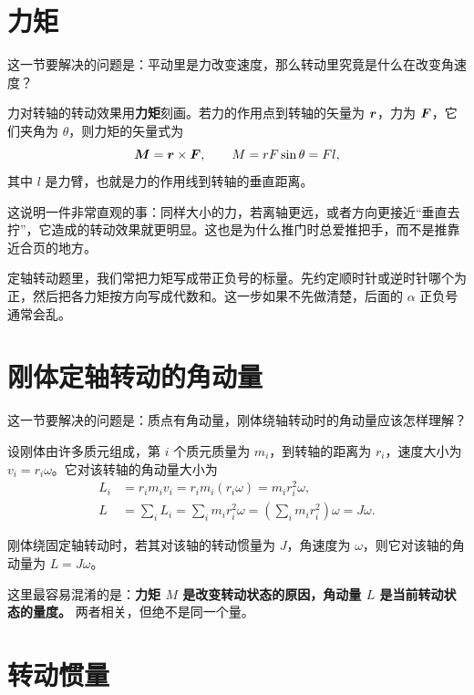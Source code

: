 \documentclass[lang=cn,11pt]{elegantbook}
\begin{document}
\section{力矩}

这一节要解决的问题是：平动里是力改变速度，那么转动里究竟是什么在改变角速度？

力对转轴的转动效果用\textbf{力矩}刻画。若力的作用点到转轴的矢量为 \(\vb*{r}\)，力为 \(\vb*{F}\)，它们夹角为 \(\theta\)，则力矩的矢量式为
\[
\vb*{M}=\vb*{r}\times \vb*{F},\qquad
M=rF\sin\theta=Fl,
\]
其中 \(l\) 是力臂，也就是力的作用线到转轴的垂直距离。

这说明一件非常直观的事：同样大小的力，若离轴更远，或者方向更接近“垂直去拧”，它造成的转动效果就更明显。这也是为什么推门时总爱推把手，而不是推靠近合页的地方。

\begin{note}
定轴转动题里，我们常把力矩写成带正负号的标量。先约定顺时针或逆时针哪个为正，然后把各力矩按方向写成代数和。这一步如果不先做清楚，后面的 \(\alpha\) 正负号通常会乱。
\end{note}

\section{刚体定轴转动的角动量}

这一节要解决的问题是：质点有角动量，刚体绕轴转动时的角动量应该怎样理解？

设刚体由许多质元组成，第 \(i\) 个质元质量为 \(m_i\)，到转轴的距离为 \(r_i\)，速度大小为 \(v_i=r_i\omega\)。它对该转轴的角动量大小为
\[
\begin{aligned}
L_i&=r_i m_i v_i=r_i m_i(r_i\omega)=m_i r_i^2\omega,\\
L&=\sum_i L_i=\sum_i m_i r_i^2\omega
=\left(\sum_i m_i r_i^2\right)\omega=J\omega.
\end{aligned}
\]

\begin{definition}[刚体定轴转动的角动量]
刚体绕固定轴转动时，若其对该轴的转动惯量为 \(J\)，角速度为 \(\omega\)，则它对该轴的角动量为 \(L=J\omega\)。
\end{definition}

\begin{note}
这里最容易混淆的是：\textbf{力矩 \(M\) 是改变转动状态的原因，角动量 \(L\) 是当前转动状态的量度。} 两者相关，但绝不是同一个量。
\end{note}

\section{转动惯量}
\end{document}
